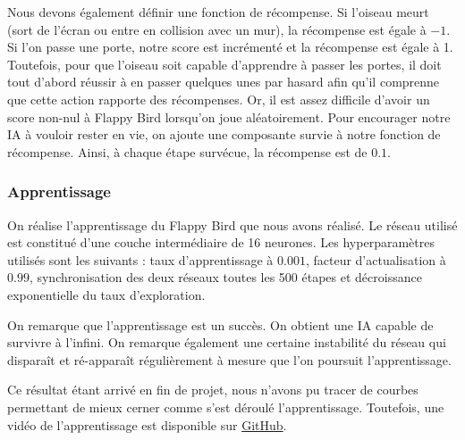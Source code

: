 Nous devons également définir une fonction de récompense. Si l'oiseau meurt (sort de l'écran ou entre en collision avec un mur), la récompense est égale à $-1$.
Si l'on passe une porte, notre score est incrémenté et la récompense est égale à 1. Toutefois, pour que l'oiseau soit capable d'apprendre à passer les portes, il doit
tout d'abord réussir à en passer quelques unes par hasard afin qu'il comprenne que cette action rapporte des récompenses. Or, il est assez difficile d'avoir un 
score non-nul à Flappy Bird lorsqu'on joue aléatoirement. Pour encourager notre IA à vouloir rester en vie, on ajoute une composante survie à notre fonction de 
récompense. Ainsi, à chaque étape survécue, la récompense est de $0.1$.

\subsubsection{Apprentissage}

On réalise l'apprentissage du Flappy Bird que nous avons réalisé. Le réseau utilisé est constitué d'une couche intermédiaire de 16 neurones. Les hyperparamètres
utilisés sont les suivants : taux d'apprentissage à $0.001$, facteur d'actualisation à $0.99$, synchronisation des deux réseaux toutes les 500 étapes et décroissance
exponentielle du taux d'exploration.

On remarque que l'apprentissage est un succès. On obtient une IA capable de survivre à l'infini. On remarque également une certaine instabilité du réseau 
qui disparaît et ré-apparaît régulièrement à mesure que l'on poursuit l'apprentissage.

Ce résultat étant arrivé en fin de projet, nous n'avons pu tracer de courbes permettant de mieux cerner comme s'est déroulé l'apprentissage.
Toutefois, une vidéo de l'apprentissage est disponible sur \href{https://github.com/ready-player-one-supelec/eponge-rapport/blob/master/videos/flappy_cloud.mp4}{GitHub}.




